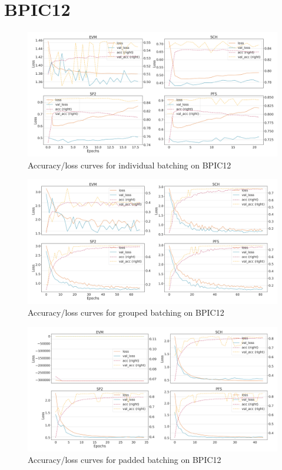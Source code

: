 \section*{BPIC12}
\begin{figure}[!htb]
    \centering
    \includegraphics[width=\textwidth]{gfx/bpic2012/individual_loss_acc_curve.png}
    \caption{Accuracy/loss curves for individual batching on BPIC12}
\end{figure}
\begin{figure}[!htb]
    \centering
    \includegraphics[width=\textwidth]{gfx/bpic2012/grouped_loss_acc_curve.png}
    \caption{Accuracy/loss curves for grouped batching on BPIC12}
\end{figure}
\begin{figure}[!htb]
    \centering
    \includegraphics[width=\textwidth]{gfx/bpic2012/padded_loss_acc_curve.png}
    \caption{Accuracy/loss curves for padded batching on BPIC12}
\end{figure}
